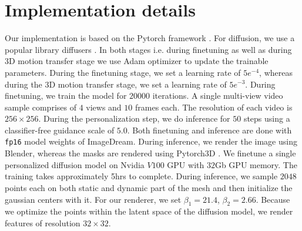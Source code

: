 


\section{Implementation details} Our implementation is based on the Pytorch framework \cite{paszke2019pytorch}. For diffusion, we use a popular library diffusers \cite{von-platen-etal-2022-diffusers}. In both stages i.e. during finetuning as well as during 3D motion transfer stage we use Adam optimizer \cite{kingma2014adam} to update the trainable parameters. During the finetuning stage, we set a learning rate of $5e^{-4}$, whereas during the 3D motion transfer stage, we set a learning rate of $5e^{-3}$. During finetuning, we train the model for $20000$ iterations. A single multi-view video sample comprises of $4$ views and $10$ frames each. The resolution of each video is $256\times256$. During the personalization step, we do inference for $50$ steps using a classifier-free guidance scale of $5.0$. Both finetuning and inference are done with \texttt{fp16} model weights of ImageDream. During inference, we render the image using Blender, whereas the masks are rendered using Pytorch3D \cite{ravi2020accelerating}. We finetune a single personalized diffusion model on Nvidia $V100$ GPU with $32$Gb GPU memory. The training takes approximately 5hrs to complete. During inference, we sample $2048$ points each on both static and dynamic part of the mesh and then initialize the gaussian centers with it. For our renderer, we set $\beta_{1}=21.4$, $\beta_{2}=2.66$. Because we optimize the points within the latent space of the diffusion model, we render features of resolution $32\times32$. 

